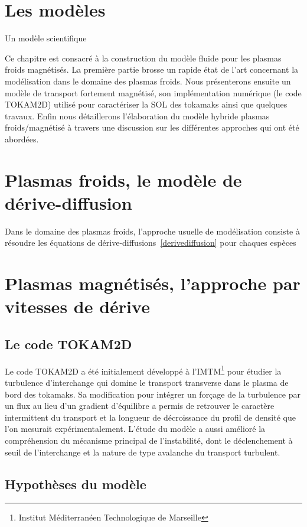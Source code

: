  	\section{Les modèles}
\lipsum Un modèle scientifique
 	
Ce chapitre est consacré à la construction du modèle fluide pour les plasmas
froids magnétisés.
La première partie brosse un rapide état de l'art concernant la modélisation
dans le domaine des plasmas froids. Nous présenterons ensuite un modèle de
transport fortement magnétisé, son implémentation numérique (le code TOKAM2D)
utilisé pour caractériser la SOL des tokamaks ainsi que quelques travaux. Enfin
nous détaillerons l'élaboration du modèle hybride plasmas froids/magnétisé à travers une
discussion sur les différentes approches qui ont été abordées.
	
	\section{Plasmas froids, le modèle de dérive-diffusion}
Dans le domaine des plasmas froids, l'approche usuelle de modélisation consiste
à résoudre les équations de dérive-diffusions~\eqref{derivediffusion} pour
chaques espèces
	\section{Plasmas magnétisés, l'approche par vitesses de dérive}
	 \subsection{Le code TOKAM2D}
Le code TOKAM2D a été initialement développé à l'IMTM\footnote{Institut Méditerranéen
Technologique de Marseille} pour étudier la turbulence d'interchange qui domine
le transport transverse dans le plasma de bord des tokamaks. Sa modification
pour intégrer un forçage de la turbulence par un flux au lieu d'un gradient
d'équilibre a permis de retrouver le caractère intermittent du
transport et la longueur de décroissance du profil de densité que l'on mesurait
expérimentalement. L'étude du modèle a aussi amélioré la compréhension du
mécanisme principal de l'instabilité, dont le déclenchement à seuil de
l'interchange et la nature de type avalanche du transport turbulent. 
		\subsection{Hypothèses du modèle}

